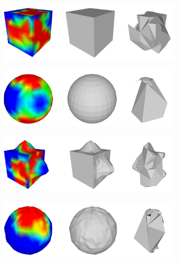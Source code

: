 \begin{figure}[p]
    \begin{subfigure}{\linewidth}
        \centering
        \includegraphics[width=\linewidth]{imagenes/experiments/cube0.png}
        \caption{}
        \label{subfig:cube0}
    \end{subfigure}
    \begin{subfigure}{\linewidth}
        \centering
        \includegraphics[width=\linewidth]{imagenes/experiments/sphere0.png}
        \caption{}
        \label{subfig:sphere0}
    \end{subfigure}
    \begin{subfigure}{\linewidth}
        \centering
        \includegraphics[width=\linewidth]{imagenes/experiments/cube1.png}
        \caption{}
        \label{subfig:cube1}
    \end{subfigure}
    \begin{subfigure}{\linewidth}
        \centering
        \includegraphics[width=\linewidth]{imagenes/experiments/sphere1.png}

\end{subfigure}
\end{figure}
